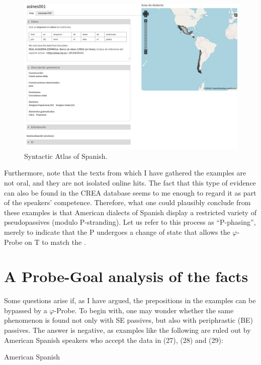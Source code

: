 \documentclass[output=paper]{langsci/langscibook}
\begin{document}
\begin{figure}\caption{Syntactic Atlas of Spanish. \citep{GallegoWebsite}\label{ex:gallego:30}}
\includegraphics[width=\textwidth]{figures/gallego-screenshot.png}
\end{figure}


Furthermore, note that the texts from which I have gathered the examples are not oral, and they are not isolated online hits. The fact that this type of evidence can also be found in the CREA database seems to me enough to regard it as part of the speakers’ competence. Therefore, what one could plausibly conclude from these examples is that American dialects of Spanish display a restricted variety of pseudopassives (modulo P-stranding). Let us refer to this process as “P-phasing”, merely to indicate that the P undergoes a change of state that allows the $\varphi ${}-Probe on T to match the \CATDP. 

\section{A Probe-Goal analysis of the facts}%


Some questions arise if, as I have argued, the prepositions in the examples can be bypassed by a $\varphi ${}-Probe. To begin with, one may wonder whether the same phenomenon is found not only with SE passives, but also with periphrastic (BE) passives. The answer is negative, as examples like the following are ruled out by American Spanish speakers who accept the data in  (27), (28) and (29):



\ea%
    American Spanish\label{ex:gallego:31}\\
    \z
\z    
\end{document}

